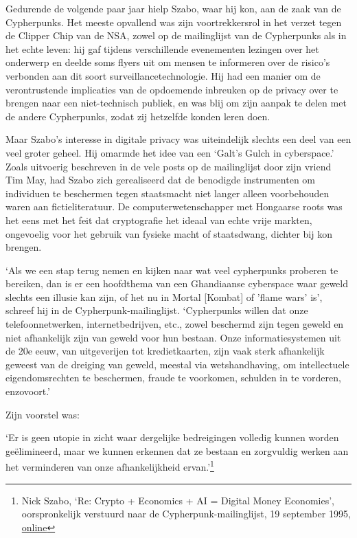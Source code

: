 \documentclass[
  a5paper,
  smalldemyvopaper,11pt,twoside,onecolumn,openright,extrafontsizes]{memoir}
\begin{document}
Gedurende de volgende paar jaar hielp Szabo, waar hij kon, aan de zaak
van de Cypherpunks. Het meeste opvallend was zijn voortrekkersrol in het
verzet tegen de Clipper Chip van de NSA, zowel op de mailinglijst van de
Cypherpunks als in het echte leven: hij gaf tijdens verschillende
evenementen lezingen over het onderwerp en deelde soms flyers uit om
mensen te informeren over de risico's verbonden aan dit soort
surveillancetechnologie. Hij had een manier om de verontrustende
implicaties van de opdoemende inbreuken op de privacy over te brengen
naar een niet-technisch publiek, en was blij om zijn aanpak te delen met
de andere Cypherpunks, zodat zij hetzelfde konden leren doen.

Maar Szabo's interesse in digitale privacy was uiteindelijk slechts een
deel van een veel groter geheel. Hij omarmde het idee van een `Galt's
Gulch in cyberspace.' Zoals uitvoerig beschreven in de vele posts op de
mailinglijst door zijn vriend Tim May, had Szabo zich gerealiseerd dat
de benodigde instrumenten om individuen te beschermen tegen staatsmacht
niet langer alleen voorbehouden waren aan fictieliteratuur. De
computerwetenschapper met Hongaarse roots was het eens met het feit dat
cryptografie het ideaal van echte vrije markten, ongevoelig voor het
gebruik van fysieke macht of staatsdwang, dichter bij kon brengen.

`Als we een stap terug nemen en kijken naar wat veel cypherpunks
proberen te bereiken, dan is er een hoofdthema van een Ghandiaanse
cyberspace waar geweld slechts een illusie kan zijn, of het nu in Mortal
{[}Kombat{]} of 'flame wars' is', schreef hij in de
Cypherpunk-mailinglijst. `Cypherpunks willen dat onze telefoonnetwerken,
internetbedrijven, etc., zowel beschermd zijn tegen geweld en niet
afhankelijk zijn van geweld voor hun bestaan. Onze informatiesystemen
uit de 20e eeuw, van uitgeverijen tot kredietkaarten, zijn vaak sterk
afhankelijk geweest van de dreiging van geweld, meestal via
wetshandhaving, om intellectuele eigendomsrechten te beschermen, fraude
te voorkomen, schulden in te vorderen, enzovoort.'

Zijn voorstel was:

`Er is geen utopie in zicht waar dergelijke bedreigingen volledig kunnen
worden geëlimineerd, maar we kunnen erkennen dat ze bestaan en
zorgvuldig werken aan het verminderen van onze afhankelijkheid
ervan.'\footnote{Nick Szabo, `Re: Crypto + Economics + AI = Digital
  Money Economies', oorspronkelijk verstuurd naar de
  Cypherpunk-mailinglijst, 19 september 1995,
  \href{https://cypherpunks.venona.com/date/1995/09/msg01303.html}{online}}
\end{document}
